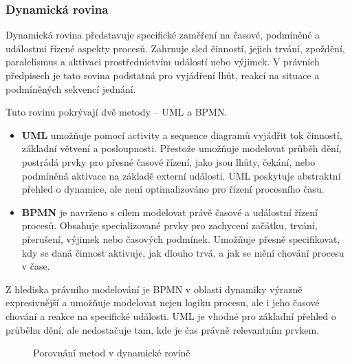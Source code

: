 
\subsubsection{Dynamická rovina}
\label{sec:dynamicka-rovina}
Dynamická rovina představuje specifické zaměření na časové, podmíněné a událostmi řízené aspekty procesů. Zahrnuje sled činností, jejich trvání, zpoždění, paralelismus a aktivaci prostřednictvím událostí nebo výjimek. V právních předpisech je tato rovina podstatná pro vyjádření lhůt, reakcí na situace a podmíněných sekvencí jednání.

Tuto rovinu pokrývají dvě metody – UML a BPMN.

\begin{itemize}
  \item \textbf{UML} umožňuje pomocí activity a sequence diagramů vyjádřit tok činností, základní větvení a posloupnosti. Přestože umožňuje modelovat průběh dění, postrádá prvky pro přesné časové řízení, jako jsou lhůty, čekání, nebo podmíněná aktivace na základě externí události. UML poskytuje abstraktní přehled o dynamice, ale není optimalizováno pro řízení procesního času.

  \item \textbf{BPMN} je navrženo s cílem modelovat právě časové a událostní řízení procesů. Obsahuje specializované prvky pro zachycení začátku, trvání, přerušení, výjimek nebo časových podmínek. Umožňuje přesně specifikovat, kdy se daná činnost aktivuje, jak dlouho trvá, a jak se mění chování procesu v čase.
\end{itemize}

\noindent Z hlediska právního modelování je BPMN v oblasti dynamiky výrazně expresivnější a umožňuje modelovat nejen logiku procesu, ale i jeho časové chování a reakce na specifické události. UML je vhodné pro základní přehled o průběhu dění, ale nedostačuje tam, kde je čas právně relevantním prvkem.

\begin{figure}[H]
  \centering
  \caption{Porovnání metod v dynamické rovině}
\end{figure}


